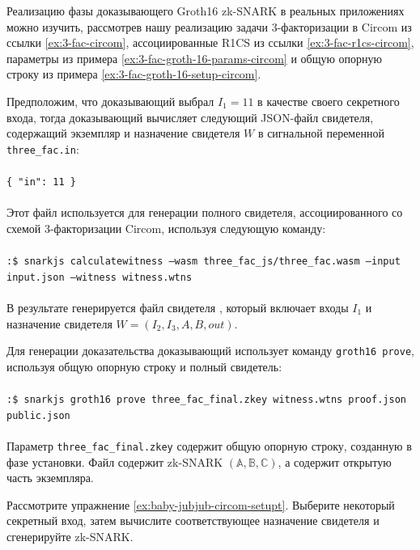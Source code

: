\begin{example}
\label{ex:3-fac-groth-16-prover-circom}
Реализацию фазы доказывающего Groth16 zk-SNARK в реальных приложениях можно изучить, рассмотрев нашу реализацию задачи 3-факторизации в Circom из ссылки \ref{ex:3-fac-circom}, ассоциированные R1CS из ссылки \ref{ex:3-fac-r1cs-circom}, параметры из примера \ref{ex:3-fac-groth-16-params-circom} и общую опорную строку из примера \ref{ex:3-fac-groth-16-setup-circom}.

Предположим, что доказывающий выбрал $I_1=11$ в качестве своего секретного входа, тогда доказывающий вычисляет следующий JSON-файл свидетеля, содержащий экземпляр и назначение свидетеля $W$ в сигнальной переменной \texttt{three\_fac.in}:
\\
\\
\texttt{\{ "in": 11 \}}
\\
\\
Этот файл используется для генерации полного свидетеля, ассоциированного со схемой 3-факторизации Circom, используя следующую команду:
\\
\\
\texttt{:\$ snarkjs calculatewitness --wasm three\_fac\_js/three\_fac.wasm --input input.json --witness witness.wtns}
\\
\\
В результате генерируется файл свидетеля , который включает входы $I_1$ и назначение свидетеля $W=(I_2,I_3,A,B,\mathit{out})$.

Для генерации доказательства доказывающий использует команду \texttt{groth16 prove}, используя общую опорную строку  и полный свидетель:
\\
\\
\texttt{:\$ snarkjs groth16 prove three\_fac\_final.zkey witness.wtns proof.json public.json}
\\
\\
Параметр \texttt{three\_fac\_final.zkey} содержит общую опорную строку, созданную в фазе установки. Файл  содержит zk-SNARK $(\mathbb{A},\mathbb{B},\mathbb{C})$, а  содержит открытую часть экземпляра.
\end{example}
\begin{exercise}
Рассмотрите упражнение \ref{ex:baby-jubjub-circom-setupt}. Выберите некоторый секретный вход, затем вычислите соответствующее назначение свидетеля и сгенерируйте zk-SNARK.
\end{exercise}
